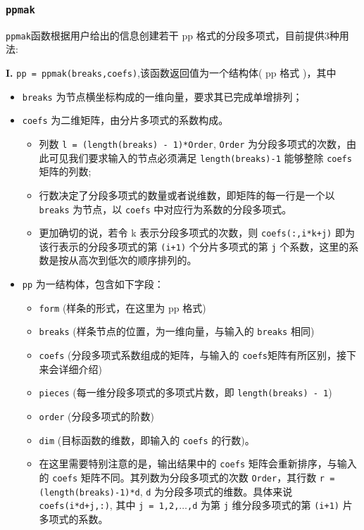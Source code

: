 \subsubsection{\texttt{ppmak}}

\texttt{ppmak}函数根据用户给出的信息创建若干 pp 格式的分段多项式，目前提供3种用法:

\textbf{I.}  \texttt{pp = ppmak(breaks,coefs)},该函数返回值为一个结构体( pp 格式 )，其中

\begin{itemize}
    \item \texttt{breaks} 为节点横坐标构成的一维向量，要求其已完成单增排列；
    \item \texttt{coefs} 为二维矩阵，由分片多项式的系数构成。
          \begin{itemize}
              \item 列数 \texttt{l = (length(breaks) - 1)*Order}, \texttt{Order} 为分段多项式的次数，由此可见我们要求输入的节点必须满足 \texttt{length(breaks)-1} 能够整除 \texttt{coefs} 矩阵的列数;
              \item 行数决定了分段多项式的数量或者说维数，即矩阵的每一行是一个以 \texttt{breaks} 为节点，以 \texttt{coefs} 中对应行为系数的分段多项式。
              \item 更加确切的说，若令 k 表示分段多项式的次数，则 \texttt{coefs(:,i*k+j)} 即为该行表示的分段多项式的第 \texttt{(i+1)} 个分片多项式的第 \texttt{j} 个系数，这里的系数是按从高次到低次的顺序排列的。
          \end{itemize}
    \item \texttt{pp} 为一结构体，包含如下字段：
          \begin{itemize}
              \item \texttt{form} (样条的形式，在这里为 pp 格式)
              \item \texttt{breaks} (样条节点的位置，为一维向量，与输入的 \texttt{breaks} 相同)
              \item \texttt{coefs} (分段多项式系数组成的矩阵，与输入的 \texttt{coefs}矩阵有所区别，接下来会详细介绍)
              \item \texttt{pieces} (每一维分段多项式的多项式片数，即 \texttt{length(breaks) - 1})
              \item \texttt{order} (分段多项式的阶数)
              \item \texttt{dim} (目标函数的维数，即输入的 \texttt{coefs} 的行数)。
              \item 在这里需要特别注意的是，输出结果中的 \texttt{coefs} 矩阵会重新排序，与输入的 \texttt{coefs} 矩阵不同。其列数为分段多项式的次数 \texttt{Order}，其行数 \texttt{r = (length(breaks)-1)*d}, \texttt{d} 为分段多项式的维数。具体来说 \texttt{coefs(i*d+j,:)}, 其中 \texttt{j = 1,2,$\dots$,d} 为第 \texttt{j} 维分段多项式的第 \texttt{(i+1)} 片多项式的系数。
          \end{itemize}
\end{itemize}

